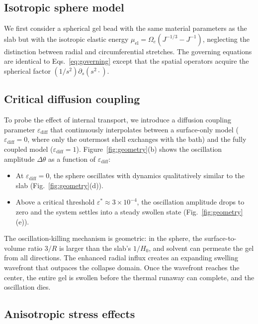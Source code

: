 \documentclass[aps,pre,reprint,superscriptaddress,longbibliography,floatfix]{revtex4-2}
\begin{document}
\subsection{Isotropic sphere model}

We first consider a spherical gel bead with the same material parameters
as the slab but with the isotropic elastic energy $\mu_\mathrm{el}=
\Omega_e(J^{-1/3}-J^{-1})$, neglecting the distinction between radial
and circumferential stretches. The governing equations are identical to
Eqs.~\eqref{eq:governing} except that the spatial operators acquire the
spherical factor $(1/s^2)\partial_s(s^2\cdot)$.

\subsection{Critical diffusion coupling}

To probe the effect of internal transport, we introduce a diffusion
coupling parameter $\varepsilon_\mathrm{diff}$ that continuously
interpolates between a surface-only model ($\varepsilon_\mathrm{diff}
=0$, where only the outermost shell exchanges with the bath) and the
fully coupled model ($\varepsilon_\mathrm{diff}=1$).
Figure~\ref{fig:geometry}(b) shows the oscillation amplitude
$\Delta\theta$ as a function of $\varepsilon_\mathrm{diff}$:
\begin{itemize}
  \item At $\varepsilon_\mathrm{diff}=0$, the sphere oscillates with
    dynamics qualitatively similar to the slab
    (Fig.~\ref{fig:geometry}(d)).
  \item Above a critical threshold $\varepsilon^*\approx 3\times
    10^{-4}$, the oscillation amplitude drops to zero and the system
    settles into a steady swollen state
    (Fig.~\ref{fig:geometry}(e)).
\end{itemize}

The oscillation-killing mechanism is geometric: in the sphere, the
surface-to-volume ratio $3/R$ is larger than the slab's $1/H_0$, and
solvent can permeate the gel from all directions. The enhanced radial
influx creates an expanding swelling wavefront that outpaces the
collapse domain. Once the wavefront reaches the center, the entire gel
is swollen before the thermal runaway can complete, and the oscillation
dies.

\subsection{Anisotropic stress effects}
\end{document}
